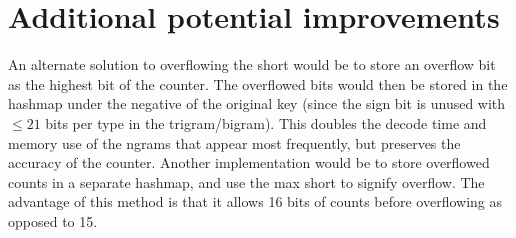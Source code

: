\documentclass[11pt]{article}
\begin{document}
\section{Additional potential improvements}

An alternate solution to overflowing the short would be to store an overflow bit as the highest bit of the counter. The overflowed bits would then be stored in the hashmap under the negative of the original key (since the sign bit is unused with $\le21$ bits per type in the trigram/bigram). This doubles the decode time and memory use of the ngrams that appear most frequently, but preserves the accuracy of the counter. Another implementation would be to store overflowed counts in a separate hashmap, and use the max short to signify overflow. The advantage of this method is that it allows 16 bits of counts before overflowing as opposed to 15.
\end{document}
